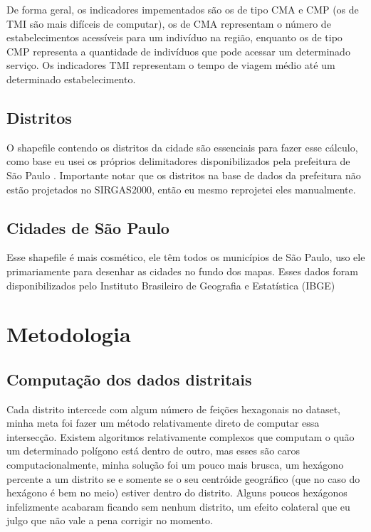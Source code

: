 \documentclass{article}
\begin{document}
\par
De forma geral, os indicadores impementados são os de tipo CMA e CMP (os de TMI são mais difíceis de computar),
os de CMA representam o número de estabelecimentos acessíveis para um indivíduo na região, enquanto os de tipo 
CMP representa a quantidade de indivíduos que pode acessar um determinado serviço. Os indicadores TMI
representam o tempo de viagem médio até um determinado estabelecimento.

\subsection{Distritos}

O shapefile contendo os distritos da cidade são essenciais para fazer esse cálculo, como base eu usei
os próprios delimitadores disponibilizados pela prefeitura de São Paulo \cite{districts}.
Importante notar que os distritos na base de dados da prefeitura não estão projetados no SIRGAS2000,
então eu mesmo reprojetei eles manualmente.

\subsection{Cidades de São Paulo}

Esse shapefile é mais cosmético, ele têm todos os municípios de São Paulo, uso ele primariamente
para desenhar as cidades no fundo dos mapas. Esses dados foram disponibilizados pelo Instituto Brasileiro
de Geografia e Estatística (IBGE) \cite{cities}

\pagebreak
\section{Metodologia}
\subsection{Computação dos dados distritais}

\par
Cada distrito intercede com algum número de feições hexagonais no dataset, minha meta foi fazer
um método relativamente direto de computar essa intersecção. Existem algoritmos relativamente
complexos que computam o quão um determinado polígono está dentro de outro, mas esses são caros
computacionalmente, minha solução foi um pouco mais brusca, um hexágono percente a um distrito se 
e somente se o seu centróide geográfico (que no caso do hexágono é bem no meio) estiver dentro do distrito.
Alguns poucos hexágonos infelizmente acabaram ficando sem nenhum distrito, um efeito colateral
que eu julgo que não vale a pena corrigir no momento.
\end{document}
